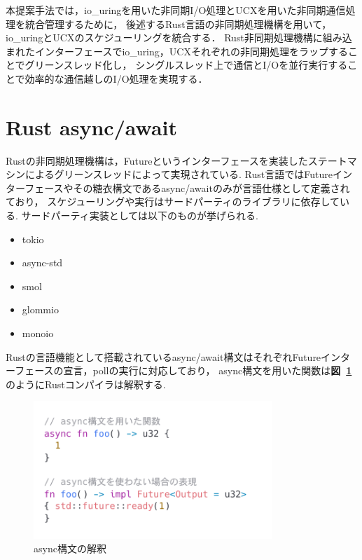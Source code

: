\documentclass[a4paper,11pt,openany]{jreport}
\newcommand\figref[1]{\textbf{図~\ref{fig:#1}}}
\begin{document}
本提案手法では，io\_uringを用いた非同期I/O処理とUCXを用いた非同期通信処理を統合管理するために，
後述するRust言語の非同期処理機構を用いて，io\_uringとUCXのスケジューリングを統合する．
Rust非同期処理機構に組み込まれたインターフェースでio\_uring，UCXそれぞれの非同期処理をラップすることでグリーンスレッド化し，
シングルスレッド上で通信とI/Oを並行実行することで効率的な通信越しのI/O処理を実現する．

\section{Rust async/await}
Rustの非同期処理機構\cite{rust-async-rfc}は，Futureというインターフェースを実装したステートマシンによるグリーンスレッドによって実現されている.
Rust言語ではFutureインターフェースやその糖衣構文であるasync/awaitのみが言語仕様として定義されており，
スケジューリングや実行はサードパーティのライブラリに依存している.
サードパーティ実装としては以下のものが挙げられる.

\begin{itemize}
	\item tokio
	\item async-std
	\item smol
	\item glommio
	\item monoio
\end{itemize}

Rustの言語機能として搭載されているasync/await構文はそれぞれFutureインターフェースの宣言，pollの実行に対応しており，
async構文を用いた関数は\figref{async}のようにRustコンパイラは解釈する.



\begin{figure}[tb]
	\centering
	\includegraphics[width=9cm, bb=0 0 800 550]{figures/async_future.png}
	\caption{async構文の解釈}
	\label{fig:async}
\end{figure}
\end{document}

